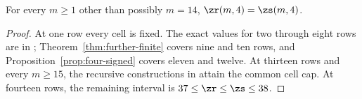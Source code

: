 \begin{corollary}\label{cor:four-exception}
For every $m\ge1$ other than possibly $m=14$,
$\zr(m,4)=\zs(m,4)$.
\end{corollary}
\begin{proof}
At one row every cell is fixed. The exact values for two through eight rows
are in \cite{LQ,XY};
Theorem~\ref{thm:further-finite} covers nine and ten rows, and
Proposition~\ref{prop:four-signed} covers eleven and twelve.
At thirteen rows and every $m\ge15$, the recursive constructions
in \cite[Table~1 and Theorem~1.1]{CC} attain the common cell cap. At fourteen rows, the
remaining interval is $37\le\zr\le\zs\le38$.
\end{proof}


